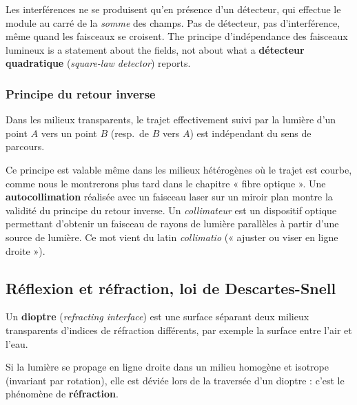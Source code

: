 \begin{remark}
  Les interférences ne se produisent qu'en présence d'un détecteur, qui effectue
  le module au carré de la \emph{somme} des champs. Pas de détecteur, pas
  d'interférence, même quand les faisceaux se croisent. The principe
  d'indépendance des faisceaux lumineux is a statement about the fields, not
  about what a \textbf{détecteur quadratique} (\textit{square-law detector})
  reports.
\end{remark}

\subsubsection{Principe du retour inverse}

\begin{postulate}
  Dans les milieux transparents, le trajet effectivement suivi par la lumière
  d'un point $A$ vers un point $B$ (resp.\ de $B$ vers $A$) est indépendant du
  sens de parcours.
\end{postulate}

Ce principe est valable même dans les milieux hétérogènes où le trajet est
courbe, comme nous le montrerons plus tard dans le chapitre « fibre optique ».
Une \textbf{autocollimation} réalisée avec un faisceau laser sur un miroir plan
montre la validité du principe du retour inverse. Un \textit{collimateur} est un
dispositif optique permettant d'obtenir un faisceau de rayons de lumière
parallèles à partir d'une source de lumière. Ce mot vient du latin
\textit{collimatio} (« ajuster ou viser en ligne droite »).

\subsection{Réflexion et réfraction, loi de Descartes-Snell}

\begin{definition}[Dioptre]
  Un \textbf{dioptre} (\textit{refracting interface}) est une surface séparant
  deux milieux transparents d'indices de réfraction différents, par exemple la
  surface entre l'air et l'eau.
\end{definition}

\begin{definition}[Réfraction]
  Si la lumière se propage en ligne droite dans un milieu homogène et isotrope
  (invariant par rotation), elle est déviée lors de la traversée d'un dioptre :
  c'est le phénomène de \textbf{réfraction}.
\end{definition}


